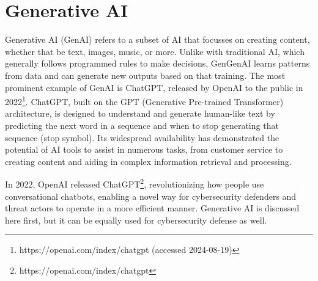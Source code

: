





\section{Generative AI}
\begin{comment}
Generative AI such as ChatGPT
What to cover:
    - What is Generative AI
    - OpenAI releasing ChatGPT to the public in 2022
    - How Generative AI can be used by both cybersecurity professionals and threat actors
    - Circumventing ChatGPT's ethical restrictions with, for example prompt injections attacks or reverse psychology (with at least 1-2 examples)
    - How scholars and regular users have found ways to bypass ChatGPT's ethical restrictions
    - NLP Natural Language Processing
    - Hyökkäys & puolustus
    - Tekoälyn päivitys kun löydetään uusia tapoja ohittaa sen eettiset ohjeistukset ja kehittäjien asettamat rajoitukset
    - Pyydetään tekoälyä roolipelaamaan social engineering skenaarioita
    - Kielioppi ja kirjoitusvirheiden korjaus scam viesteissä
\end{comment}

Generative AI (GenAI) refers to a subset of AI that focusses on creating content, whether that be text, images, music, or more. Unlike with traditional AI, which generally follows programmed rules to make decisions, GenGenAI learns patterns from data and can generate new outputs based on that training. The most prominent example of GenAI is ChatGPT, released by OpenAI to the public in 2022\footnote{https://openai.com/index/chatgpt (accessed 2024-08-19)}. ChatGPT, built on the GPT (Generative Pre-trained Transformer) architecture, is designed to understand and generate human-like text by predicting the next word in a sequence and when to stop generating that sequence (stop symbol). Its widespread availability has demonstrated the potential of AI tools to assist in numerous tasks, from customer service to creating content and aiding in complex information retrieval and processing.

In 2022, OpenAI released ChatGPT\footnote{https://openai.com/index/chatgpt}, revolutionizing how people use conversational chatbots, enabling a novel way for cybersecurity defenders and threat actors to operate in a more efficient manner. Generative AI is discussed here first, but it can be equally used for cybersecurity defense as well.

